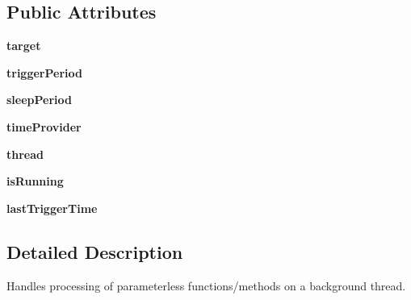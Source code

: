 \subsection*{Public Attributes}
\begin{DoxyCompactItemize}
\item 
{\bfseries target}\hypertarget{classChronos_1_1Processor_1_1BackgroundProcessor_a71c47f37ada2a140348e351e5c398f39}{}\label{classChronos_1_1Processor_1_1BackgroundProcessor_a71c47f37ada2a140348e351e5c398f39}

\item 
{\bfseries trigger\+Period}\hypertarget{classChronos_1_1Processor_1_1BackgroundProcessor_ad9597ab7b62c54b60c09c9c4334fd6bf}{}\label{classChronos_1_1Processor_1_1BackgroundProcessor_ad9597ab7b62c54b60c09c9c4334fd6bf}

\item 
{\bfseries sleep\+Period}\hypertarget{classChronos_1_1Processor_1_1BackgroundProcessor_a5ce734d5ed9a211f3c2cce0da619d5a0}{}\label{classChronos_1_1Processor_1_1BackgroundProcessor_a5ce734d5ed9a211f3c2cce0da619d5a0}

\item 
{\bfseries time\+Provider}\hypertarget{classChronos_1_1Processor_1_1BackgroundProcessor_acc048c2bed98c4f8905f1fb0cdfd962d}{}\label{classChronos_1_1Processor_1_1BackgroundProcessor_acc048c2bed98c4f8905f1fb0cdfd962d}

\item 
{\bfseries thread}\hypertarget{classChronos_1_1Processor_1_1BackgroundProcessor_aae210d944a937d4588f7733974d5dc3f}{}\label{classChronos_1_1Processor_1_1BackgroundProcessor_aae210d944a937d4588f7733974d5dc3f}

\item 
{\bfseries is\+Running}\hypertarget{classChronos_1_1Processor_1_1BackgroundProcessor_a4f82884d8cc98c0839b110da7619f85d}{}\label{classChronos_1_1Processor_1_1BackgroundProcessor_a4f82884d8cc98c0839b110da7619f85d}

\item 
{\bfseries last\+Trigger\+Time}\hypertarget{classChronos_1_1Processor_1_1BackgroundProcessor_aade99aef56a7c6e30176228a921a446f}{}\label{classChronos_1_1Processor_1_1BackgroundProcessor_aade99aef56a7c6e30176228a921a446f}

\end{DoxyCompactItemize}


\subsection{Detailed Description}
Handles processing of parameterless functions/methods on a background thread. 

